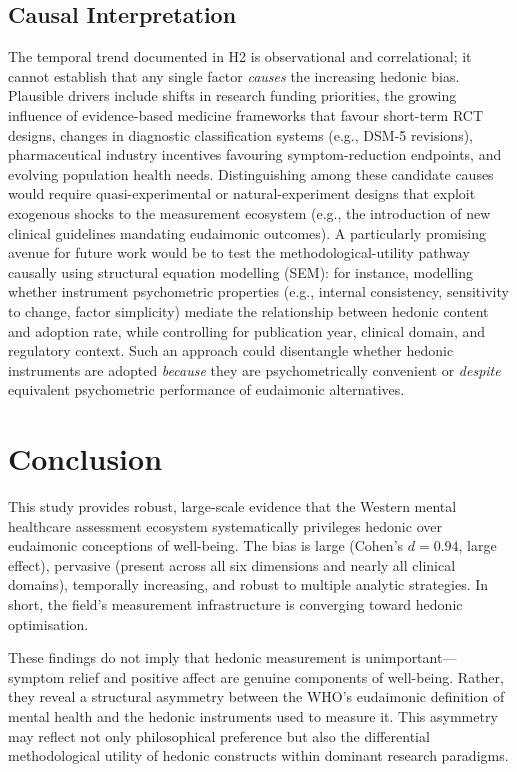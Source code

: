\documentclass[12pt,a4paper]{article}
\begin{document}
\subsection{Causal Interpretation}

The temporal trend documented in H2 is observational and correlational; it cannot establish that any single factor \textit{causes} the increasing hedonic bias.
Plausible drivers include shifts in research funding priorities, the growing influence of evidence-based medicine frameworks that favour short-term RCT designs, changes in diagnostic classification systems (e.g., DSM-5 revisions), pharmaceutical industry incentives favouring symptom-reduction endpoints, and evolving population health needs.
Distinguishing among these candidate causes would require quasi-experimental or natural-experiment designs that exploit exogenous shocks to the measurement ecosystem (e.g., the introduction of new clinical guidelines mandating eudaimonic outcomes).
A particularly promising avenue for future work would be to test the methodological-utility pathway causally using structural equation modelling (SEM): for instance, modelling whether instrument psychometric properties (e.g., internal consistency, sensitivity to change, factor simplicity) mediate the relationship between hedonic content and adoption rate, while controlling for publication year, clinical domain, and regulatory context.
Such an approach could disentangle whether hedonic instruments are adopted \textit{because} they are psychometrically convenient or \textit{despite} equivalent psychometric performance of eudaimonic alternatives.

\section{Conclusion}\label{sec:conclusion}

This study provides robust, large-scale evidence that the Western mental healthcare assessment ecosystem systematically privileges hedonic over eudaimonic conceptions of well-being.
The bias is large (Cohen's $d = 0.94$, large effect), pervasive (present across all six dimensions and nearly all clinical domains), temporally increasing, and robust to multiple analytic strategies.
In short, the field's measurement infrastructure is converging toward hedonic optimisation.

These findings do not imply that hedonic measurement is unimportant---symptom relief and positive affect are genuine components of well-being.
Rather, they reveal a structural asymmetry between the WHO's eudaimonic definition of mental health and the hedonic instruments used to measure it.
This asymmetry may reflect not only philosophical preference but also the differential methodological utility of hedonic constructs within dominant research paradigms.
\end{document}
